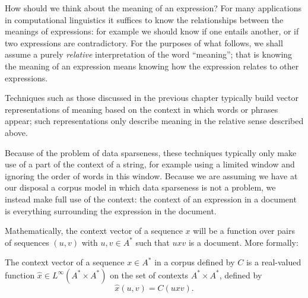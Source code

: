 \documentclass[11pt]{report}
\begin{document}
 How should we think about the meaning of an expression? For many applications in computational linguistics it suffices to know the relationships between the meanings of expressions: for example we should know if one entails another, or if two expressions are contradictory. For the purposes of what follows, we shall assume a purely \emph{relative} interpretation of the word ``meaning''; that is knowing the meaning of an expression means knowing how the expression relates to other expressions.

Techniques such as those discussed in the previous chapter typically build vector representations of meaning based on the context in which words or phrases appear; such representations only describe meaning in the relative sense described above.

Because of the problem of data sparseness, these techniques typically only make use of a part of the context of a string, for example using a limited window and ignoring the order of words in this window. Because we are assuming we have at our disposal a corpus model in which data sparseness is not a problem, we instead make full use of the context: the context of an expression in a document is  everything surrounding the expression in the document.




Mathematically, the context vector of a sequence $x$ will be a function over pairs of sequences $(u,v)$ with $u,v \in A^*$ such that $uxv$ is a document. More formally:
\begin{defn}
The context vector of a sequence $x \in A^*$ in a corpus defined by $C$ is a real-valued function $\hat{x}\in L^\infty(A^*\times A^*)$  on the set of contexts $A^* \times A^*$, defined by
$$\hat{x}(u,v) = C(uxv).$$
\end{defn}
\end{document}

